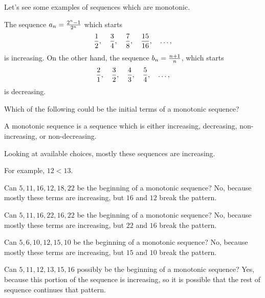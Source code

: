\documentclass{ximera}
\begin{document}

Let's see some examples of sequences which are monotonic.
\begin{example}
The sequence $ a_n = {2^n-1\over2^n}$ which starts
$$
  {1\over2},\quad {3\over4},\quad {7\over8},\quad {15\over16},\quad \ldots,
$$
is increasing.  On the other hand, the sequence $ b_n = {n+1\over n}$, which starts
$$ 
  {2\over1},\quad{3\over2},\quad{4\over3},\quad{5\over4},\quad\ldots,
$$
is decreasing.
\end{example}

\begin{question}
  Which of the following could be the initial terms of a monotonic sequence?

    \begin{hint}
      A monotonic sequence is a sequence which is either increasing, decreasing, non-increasing, or non-decreasing.
    \end{hint}
    \begin{hint}
      Looking at available choices, mostly these sequences are increasing.
    \end{hint}
    \begin{hint}
      For example, $12 < 13$.
    \end{hint}
    \begin{hint}
      Can $5,  11,  16,  12,  18,  22 $ be the beginning of a monotonic sequence?  No, because mostly these terms are increasing, but $16$ and $12$ break the pattern.
    \end{hint}
    \begin{hint}
      Can $5,  11,  16,  22,  16,  22 $ be the beginning of a monotonic sequence?  No, because mostly these terms are increasing, but $22$ and $16$ break the pattern.
    \end{hint}
    \begin{hint}
      Can $5,  6,  10,  12,  15,  10 $ be the beginning of a monotonic sequence?  No, because mostly these terms are increasing, but $15$ and $10$ break the pattern.
    \end{hint}
    \begin{hint}
      Can $5,  11,  12,  13,  15,  16 $ possibly be the beginning of a monotonic sequence?  Yes, because this portion of the sequence is increasing, so it is possible that the rest of sequence continues that pattern.
    \end{hint}


    \begin{multipleChoice}
      
    \end{multipleChoice}
    
\end{question}
\end{document}
